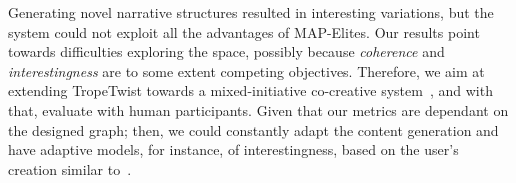 Generating novel narrative structures resulted in interesting variations, but the system could not exploit all the advantages of MAP-Elites. Our results point towards difficulties exploring the space, possibly because \emph{coherence} and \emph{interestingness} are to some extent competing objectives. Therefore, we aim at extending TropeTwist towards a mixed-initiative co-creative system~, and with that, evaluate with human participants. Given that our metrics are dependant on the designed graph; then, we could constantly adapt the content generation and have adaptive models, for instance, of interestingness, based on the user's creation similar to~. 







